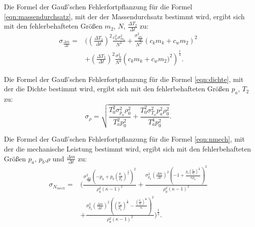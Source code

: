 \noindent Die Formel der Gauß'schen Fehlerfortpflanzung für die Formel \ref{eqn:massendurchsatz}, mit der der Massendurchsatz bestimmt wird, ergibt sich mit den fehlerbehafteten Größen 
$m_2$, $N$, $\frac{\Delta T_2}{\Delta t}$ zu:
\begin{equation}
    \begin{split}
        \sigma_{\frac{\Delta m}{\Delta t}} = {} & \Biggl(\left(\frac{\Delta T_2}{\Delta t}\right)^{2}\frac{c_{w}^{2} \sigma_{m_{2}}^{2}}{N^{2}} 
    + \frac{\sigma_{\frac{\Delta T_2}{\Delta t}}^{2}}{N^{2}} \left(c_{k} m_{k} + c_{w} m_{2}\right)^{2} \\ 
    &    +\left(\frac{\Delta T_2}{\Delta t}\right)^{2} \frac{\sigma_{N}^{2}}{N^{4}} \left(c_{k} m_{k} + c_{w} m_{2}\Biggr)^{2}\right)^{\frac{1}{2}}.
    \end{split}
    \label{eq:massendurchsatzFehler}
\end{equation}

\noindent Die Formel der Gauß'schen Fehlerfortpflanzung für die Formel \ref{eqn:dichte}, mit der die Dichte bestimmt wird, ergibt sich mit den fehlerbehafteten Größen 
$p_a$, $T_2$ zu:
\begin{equation}
 \sigma_{\rho} =\sqrt{\frac{T_{0}^{2} \sigma_{p_{a}}^{2} \rho_{0}^{2}}{T_{a}^{2} p_{0}^{2}} + \frac{T_{0}^{2} \sigma_{T_{a}}^{2} p_{a}^{2} \rho_{0}^{2}}{T_{a}^{4} p_{0}^{2}}}.
    \label{eq:dichteFehler}
\end{equation}

\noindent Die Formel der Gauß'schen Fehlerfortpflanzung für die Formel \ref{eqn:nmech}, mit der die mechanische Leistung bestimmt wird, ergibt sich mit den fehlerbehafteten Größen 
$p_a$, $p_b$,$\rho$ und $\frac{\Delta m}{\Delta t}$ zu:
\begin{equation}
    \begin{split}
        \sigma_{N_{mech}}= {} & \Biggl(\frac{\sigma_{\frac{\Delta m}{\Delta t}}^{2} \left(- p_{a} + p_{b} \left(\frac{p_{a}}{p_{b}}\right)^{\frac{1}{\kappa}}\right)^{2}}{\rho_{0}^{2} \left(\kappa - 1\right)^{2}} 
            + \frac{\sigma_{p_{a}}^{2} \left(\frac{\Delta m}{\Delta t}\right)^{2} \left(-1 + \frac{p_{b} \left(\frac{p_{a}}{p_{b}}\right)^{\frac{1}{\kappa}}}{\kappa p_{a}}\right)^{2}}{\rho_{0}^{2} \left(\kappa - 1\right)^{2}} \\ 
                       & + \frac{\sigma_{p_{b}}^{2} \left(\frac{\Delta m}{\Delta t}\right)^{2} \left(\left(\frac{p_{a}}{p_{b}}\right)^{\frac{1}{\kappa}} - \frac{\left(\frac{p_{a}}{p_{b}}\right)^{\frac{1}{\kappa}}}{\kappa}\right)^{2}}{\rho_{0}^{2} \left(\kappa - 1\right)^{2}} \Biggr)^{\frac{1}{2}}.
    \end{split}
    \label{eq:nmechFehler}
\end{equation}